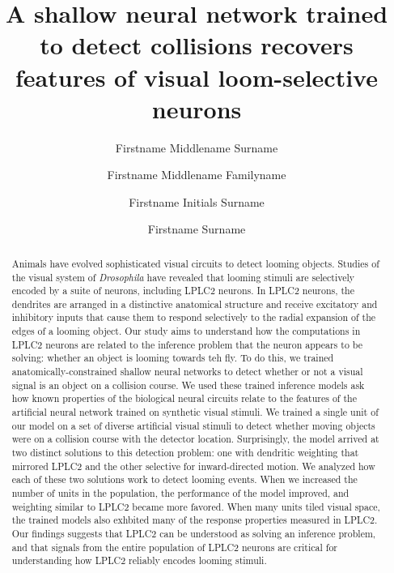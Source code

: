 \documentclass[9pt,lineno]{elife}
\title{A shallow neural network trained to detect collisions recovers features of visual loom-selective neurons}
\author[1*]{Firstname Middlename Surname}
\author[1,2\authfn{1}\authfn{3}]{Firstname Middlename Familyname}
\author[2\authfn{1}\authfn{4}]{Firstname Initials Surname}
\author[2*]{Firstname Surname}
\affil[1]{Institution 1}
\affil[2]{Institution 2}
\begin{document}
\maketitle




\begin{abstract}
Animals have evolved sophisticated visual circuits to detect looming objects. Studies of the visual system of \textit{Drosophila} have revealed that looming stimuli are selectively encoded by a suite of neurons, including LPLC2 neurons. In LPLC2 neurons, the dendrites are arranged in a distinctive anatomical structure and receive excitatory and inhibitory inputs that cause them to respond selectively to the radial expansion of the edges of a looming object. Our study aims to understand how the computations in LPLC2 neurons are related to the inference problem that the neuron appears to be solving: whether an object is looming towards teh fly. To do this, we trained anatomically-constrained shallow neural networks to detect whether or not a visual signal is an object on a collision course. We used these trained inference models ask how known properties of the biological neural circuits relate to the features of the artificial neural network trained on synthetic visual stimuli. We trained a single unit of our model on a set of diverse artificial visual stimuli to detect whether moving objects were on a collision course with the detector location. Surprisingly, the model arrived at two distinct solutions to this detection problem: one with dendritic weighting that mirrored LPLC2 and the other selective for inward-directed motion. We analyzed how each of these two solutions work to detect looming events. When we increased the number of units in the population, the performance of the model improved, and weighting similar to LPLC2 became more favored. When many units tiled visual space, the trained models also exhbited many of the response properties measured in LPLC2. Our findings suggests that LPLC2 can be understood as solving an inference problem, and that signals from the entire population of LPLC2 neurons are critical for understanding how LPLC2 reliably encodes looming stimuli.
\end{abstract}
\end{document}

